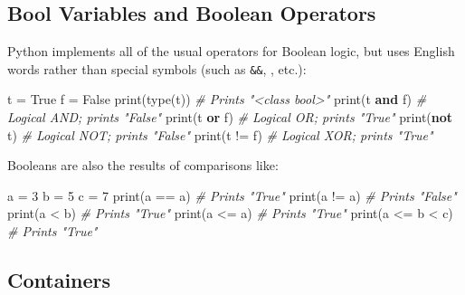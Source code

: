 \documentclass[
]{article}
\newenvironment{Shaded}{}{}
\newcommand{\BuiltInTok}[1]{#1}
\newcommand{\CommentTok}[1]{\textcolor[rgb]{0.38,0.63,0.69}{\textit{#1}}}
\newcommand{\DecValTok}[1]{\textcolor[rgb]{0.25,0.63,0.44}{#1}}
\newcommand{\KeywordTok}[1]{\textcolor[rgb]{0.00,0.44,0.13}{\textbf{#1}}}
\newcommand{\NormalTok}[1]{#1}
\newcommand{\OperatorTok}[1]{\textcolor[rgb]{0.40,0.40,0.40}{#1}}
\newcommand{\VariableTok}[1]{\textcolor[rgb]{0.10,0.09,0.49}{#1}}
\begin{document}
\hypertarget{bool-variables-and-boolean-operators}{%
\subsection{Bool Variables and Boolean
Operators}\label{bool-variables-and-boolean-operators}}

Python implements all of the usual operators for Boolean logic, but uses
English words rather than special symbols (such as \texttt{\&\&},
\texttt{\textbar{}\textbar{}}, etc.):

\begin{Shaded}
\begin{Highlighting}[]
\NormalTok{t }\OperatorTok{=} \VariableTok{True}
\NormalTok{f }\OperatorTok{=} \VariableTok{False}
\BuiltInTok{print}\NormalTok{(}\BuiltInTok{type}\NormalTok{(t)) }\CommentTok{\# Prints "\textless{}class \textquotesingle{}bool\textquotesingle{}\textgreater{}"}
\BuiltInTok{print}\NormalTok{(t }\KeywordTok{and}\NormalTok{ f) }\CommentTok{\# Logical AND; prints "False"}
\BuiltInTok{print}\NormalTok{(t }\KeywordTok{or}\NormalTok{ f)  }\CommentTok{\# Logical OR; prints "True"}
\BuiltInTok{print}\NormalTok{(}\KeywordTok{not}\NormalTok{ t)   }\CommentTok{\# Logical NOT; prints "False"}
\BuiltInTok{print}\NormalTok{(t }\OperatorTok{!=}\NormalTok{ f)  }\CommentTok{\# Logical XOR; prints "True"}
\end{Highlighting}
\end{Shaded}

Booleans are also the results of comparisons like:

\begin{Shaded}
\begin{Highlighting}[]
\NormalTok{a }\OperatorTok{=} \DecValTok{3}
\NormalTok{b }\OperatorTok{=} \DecValTok{5}
\NormalTok{c }\OperatorTok{=} \DecValTok{7}
\BuiltInTok{print}\NormalTok{(a }\OperatorTok{==}\NormalTok{ a)     }\CommentTok{\# Prints "True"}
\BuiltInTok{print}\NormalTok{(a }\OperatorTok{!=}\NormalTok{ a)     }\CommentTok{\# Prints "False"}
\BuiltInTok{print}\NormalTok{(a }\OperatorTok{\textless{}}\NormalTok{ b)      }\CommentTok{\# Prints "True"}
\BuiltInTok{print}\NormalTok{(a }\OperatorTok{\textless{}=}\NormalTok{ a)     }\CommentTok{\# Prints "True"}
\BuiltInTok{print}\NormalTok{(a }\OperatorTok{\textless{}=}\NormalTok{ b }\OperatorTok{\textless{}}\NormalTok{ c) }\CommentTok{\# Prints "True"}
\end{Highlighting}
\end{Shaded}

\hypertarget{containers}{%
\subsection{Containers}\label{containers}}
\end{document}
